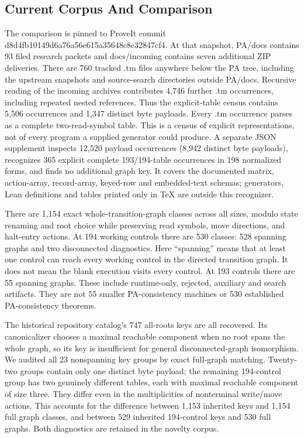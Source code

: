 \subsection{Current Corpus And Comparison}

The comparison is pinned to ProveIt commit d8d4fb10149d6a76a56e615a35648c8c32847cf4. At that snapshot, PA/docs contains 93 filed research packets and docs/incoming contains seven additional ZIP deliveries. There are 760 tracked .tm files anywhere below the PA tree, including the upstream snapshots and source-search directories outside PA/docs. Recursive reading of the incoming archives contributes 4,746 further .tm occurrences, including repeated nested references. Thus the explicit-table census contains 5,506 occurrences and 1,347 distinct byte payloads. Every .tm occurrence parses as a complete two-read-symbol table. This is a census of explicit representations, not of every program a supplied generator could produce. A separate JSON supplement inspects 12,520 payload occurrences (8,942 distinct byte payloads), recognizes 365 explicit complete 193/194-table occurrences in 198 normalized forms, and finds no additional graph key. It covers the documented matrix, action-array, record-array, keyed-row and embedded-text schemas; generators, Lean definitions and tables printed only in TeX are outside this recognizer.

There are 1,154 exact whole-transition-graph classes across all sizes, modulo state renaming and root choice while preserving read symbols, move directions, and halt-entry actions. At 194 working controls there are 530 classes: 528 spanning graphs and two disconnected diagnostics. Here “spanning” means that at least one control can reach every working control in the directed transition graph. It does not mean the blank execution visits every control. At 193 controls there are 55 spanning graphs. These include runtime-only, rejected, auxiliary and search artifacts. They are not 55 smaller PA-consistency machines or 530 established PA-consistency theorems.

The historical repository catalog's 747 all-roots keys are all recovered. Its canonicalizer chooses a maximal reachable component when no root spans the whole graph, so its key is insufficient for general disconnected-graph isomorphism. We audited all 23 nonspanning key groups by exact full-graph matching. Twenty-two groups contain only one distinct byte payload; the remaining 194-control group has two genuinely different tables, each with maximal reachable component of size three. They differ even in the multiplicities of nonterminal write/move actions. This accounts for the difference between 1,153 inherited keys and 1,154 full graph classes, and between 529 inherited 194-control keys and 530 full graphs. Both diagnostics are retained in the novelty corpus.


